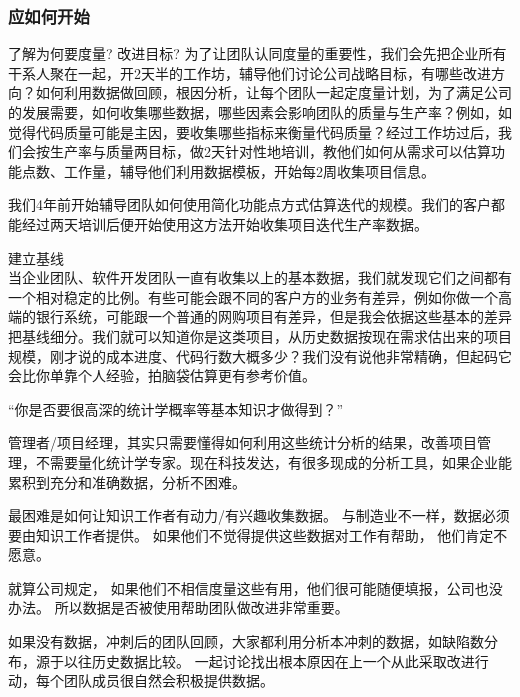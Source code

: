 \hypertarget{ux5e94ux5982ux4f55ux5f00ux59cb}{%
\subsubsection{应如何开始}\label{ux5e94ux5982ux4f55ux5f00ux59cb}}

了解为何要度量? 改进目标?
为了让团队认同度量的重要性，我们会先把企业所有干系人聚在一起，开2天半的工作坊，辅导他们讨论公司战略目标，有哪些改进方向？如何利用数据做回顾，根因分析，让每个团队一起定度量计划，为了满足公司的发展需要，如何收集哪些数据，哪些因素会影响团队的质量与生产率？例如，如觉得代码质量可能是主因，要收集哪些指标来衡量代码质量？经过工作坊过后，我们会按生产率与质量两目标，做2天针对性地培训，教他们如何从需求可以估算功能点数、工作量，辅导他们利用数据模板，开始每2周收集项目信息。

我们4年前开始辅导团队如何使用简化功能点方式估算迭代的规模。我们的客户都能经过两天培训后便开始使用这方法开始收集项目迭代生产率数据。

建立基线\\
当企业团队、软件开发团队一直有收集以上的基本数据，我们就发现它们之间都有一个相对稳定的比例。有些可能会跟不同的客户方的业务有差异，例如你做一个高端的银行系统，可能跟一个普通的网购项目有差异，但是我会依据这些基本的差异把基线细分。我们就可以知道你是这类项目，从历史数据按现在需求估出来的项目规模，刚才说的成本进度、代码行数大概多少？我们没有说他非常精确，但起码它会比你单靠个人经验，拍脑袋估算更有参考价值。


``你是否要很高深的统计学概率等基本知识才做得到？''

管理者/项目经理，其实只需要懂得如何利用这些统计分析的结果，改善项目管理，不需要量化统计学专家。现在科技发达，有很多现成的分析工具，如果企业能累积到充分和准确数据，分析不困难。

最困难是如何让知识工作者有动力/有兴趣收集数据。
与制造业不一样，数据必须要由知识工作者提供。
如果他们不觉得提供这些数据对工作有帮助， 他们肯定不愿意。

就算公司规定，
如果他们不相信度量这些有用，他们很可能随便填报，公司也没办法。
所以数据是否被使用帮助团队做改进非常重要。

如果没有数据，冲刺后的团队回顾，大家都利用分析本冲刺的数据，如缺陷数分布，源于以往历史数据比较。
一起讨论找出根本原因在上一个从此采取改进行动，每个团队成员很自然会积极提供数据。

